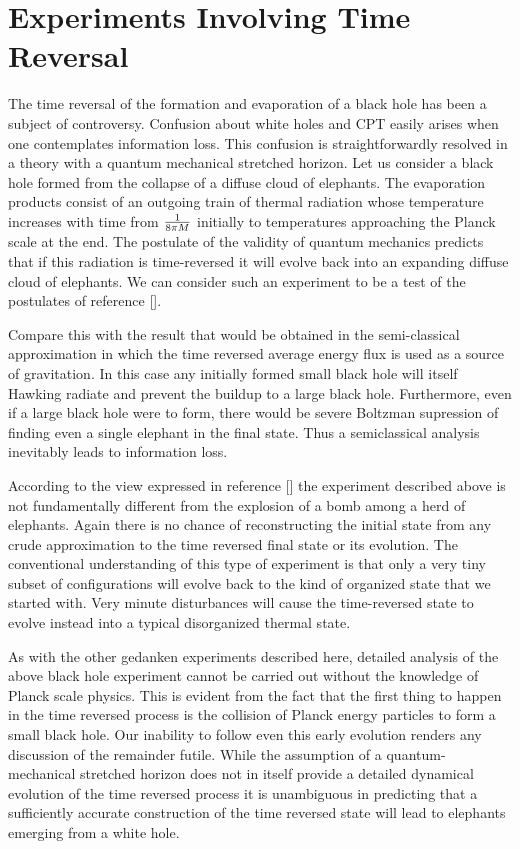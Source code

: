 \chapter{Experiments Involving Time Reversal}

The time reversal of the formation and evaporation of a black hole
has been a subject of controversy.  Confusion about white holes and
CPT easily arises when one contemplates information loss.  This
confusion is straightforwardly resolved in a theory with a quantum
mechanical stretched horizon.  Let us consider a black hole formed
from the collapse of a diffuse cloud of elephants.  The evaporation
products consist of an outgoing train of thermal radiation whose
temperature increases with time from ${1 \over 8 \pi M}$ initially to
temperatures approaching the Planck scale at the end.  The postulate
of the validity of quantum mechanics  predicts that if this radiation
is time-reversed it will evolve back into an expanding diffuse cloud
of elephants.  We can consider such an experiment to be a test of the
postulates of reference [\stu].

Compare this with the result that would be obtained in the
semi-classical approximation in which the time reversed average
energy flux is used as a source of gravitation.  In this case any
initially formed small black hole will itself Hawking radiate and
prevent the buildup to a large black hole.  Furthermore, even if a
large black hole were to form, there would be severe Boltzman
supression of finding even a single elephant in the final state.
Thus a semiclassical analysis inevitably leads to information loss.

According to the view expressed in reference [\stu] the experiment
described above is not fundamentally different from the explosion of
a bomb among a herd of elephants.  Again there is no chance of
reconstructing the initial state from any crude approximation to the
time reversed final state or its evolution.  The conventional
understanding of this type of experiment is that only a very tiny
subset of configurations will evolve back to the kind of organized
state that we started with.  Very minute disturbances will cause the
time-reversed state to evolve instead into a typical disorganized
thermal state.

As with the other gedanken experiments described here, detailed
analysis of the above black hole experiment cannot be carried out
without the knowledge of Planck scale physics.  This is evident from
the fact that the first thing to happen in the time reversed process
is the collision of Planck energy particles to form a small black
hole. Our inability to follow even this early evolution renders any
discussion of the remainder futile.  While the assumption of a
quantum-mechanical stretched horizon does not in itself provide a
detailed dynamical evolution of the time reversed process it is
unambiguous in predicting that a sufficiently accurate construction
of the time reversed state will lead to elephants emerging from a
white hole.

